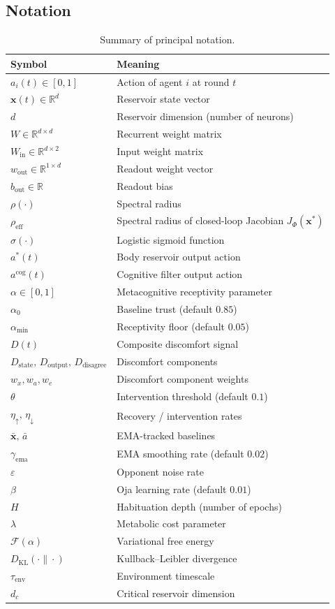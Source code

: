 \documentclass[11pt,a4paper]{article}
\theoremstyle{definition}
\newcommand{\R}{\mathbb{R}}
\newcommand{\KL}{D_{\mathrm{KL}}}
\newcommand{\FE}{\mathcal{F}}
\newcommand{\Wres}{W}
\newcommand{\Wout}{w_{\mathrm{out}}}
\newcommand{\Win}{W_{\mathrm{in}}}
\newcommand{\xstate}{\mathbf{x}}
\newcommand{\acog}{a^{\mathrm{cog}}}
\newcommand{\abody}{a^{*}}
\newcommand{\bout}{b_{\mathrm{out}}}
\begin{document}
\subsection*{Notation}
\label{sec:notation}
\begin{table}[h]
\centering
\small
\begin{tabular}{ll}
\toprule
\textbf{Symbol} & \textbf{Meaning} \\
\midrule
$a_i(t) \in [0,1]$ & Action of agent $i$ at round $t$ \\
$\xstate(t) \in \R^d$ & Reservoir state vector \\
$d$ & Reservoir dimension (number of neurons) \\
$\Wres \in \R^{d \times d}$ & Recurrent weight matrix \\
$\Win \in \R^{d \times 2}$ & Input weight matrix \\
$\Wout \in \R^{1 \times d}$ & Readout weight vector \\
$\bout \in \R$ & Readout bias \\
$\rho(\cdot)$ & Spectral radius \\
$\rho_{\mathrm{eff}}$ & Spectral radius of closed-loop Jacobian $J_{\Phi}(\xstate^{*})$ \\
$\sigma(\cdot)$ & Logistic sigmoid function \\
$\abody(t)$ & Body reservoir output action \\
$\acog(t)$ & Cognitive filter output action \\
$\alpha \in [0,1]$ & Metacognitive receptivity parameter \\
$\alpha_0$ & Baseline trust (default $0.85$) \\
$\alpha_{\min}$ & Receptivity floor (default $0.05$) \\
$D(t)$ & Composite discomfort signal \\
$D_{\mathrm{state}},\, D_{\mathrm{output}},\, D_{\mathrm{disagree}}$ & Discomfort components \\
$w_x, w_a, w_e$ & Discomfort component weights \\
$\theta$ & Intervention threshold (default $0.1$) \\
$\eta_{\uparrow},\, \eta_{\downarrow}$ & Recovery / intervention rates \\
$\bar{\xstate},\, \bar{a}$ & EMA-tracked baselines \\
$\gamma_{\mathrm{ema}}$ & EMA smoothing rate (default $0.02$) \\
$\varepsilon$ & Opponent noise rate \\
$\beta$ & Oja learning rate (default $0.01$) \\
$H$ & Habituation depth (number of epochs) \\
$\lambda$ & Metabolic cost parameter \\
$\FE(\alpha)$ & Variational free energy \\
$\KL(\cdot \| \cdot)$ & Kullback--Leibler divergence \\
$\tau_{\mathrm{env}}$ & Environment timescale \\
$d_c$ & Critical reservoir dimension \\
\bottomrule
\end{tabular}
\caption{Summary of principal notation.}
\label{tab:notation}
\end{table}
\end{document}
